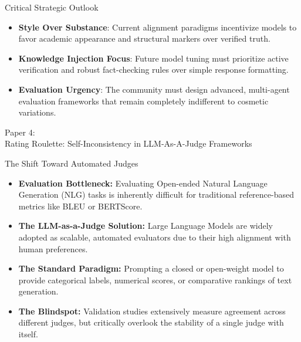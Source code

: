 \documentclass[10pt]{beamer}
\begin{document}
\begin{frame}{Critical Strategic Outlook}
  \begin{itemize}
    \item \textbf{Style Over Substance}: Current alignment paradigms incentivize models to favor academic appearance and structural markers over verified truth.
    \item \textbf{Knowledge Injection Focus}: Future model tuning must prioritize active verification and robust fact-checking rules over simple response formatting.
    \item \textbf{Evaluation Urgency}: The community must design advanced, multi-agent evaluation frameworks that remain completely indifferent to cosmetic variations.
  \end{itemize}
\end{frame}




\begin{frame}[standout]
  \hypertarget{paper4}{}
  \Large Paper 4:\\Rating Roulette: Self-Inconsistency in LLM-As-A-Judge Frameworks
\end{frame}

\begin{frame}{The Shift Toward Automated Judges}
  \begin{itemize}
    \item \textbf{Evaluation Bottleneck:} Evaluating Open-ended Natural Language Generation (NLG) tasks is inherently difficult for traditional reference-based metrics like BLEU or BERTScore.
    \item \textbf{The LLM-as-a-Judge Solution:} Large Language Models are widely adopted as scalable, automated evaluators due to their high alignment with human preferences.
    \item \textbf{The Standard Paradigm:} Prompting a closed or open-weight model to provide categorical labels, numerical scores, or comparative rankings of text generation.
    \item \textbf{The Blindspot:} Validation studies extensively measure agreement across different judges, but critically overlook the stability of a single judge with itself.
  \end{itemize}
\end{frame}
\end{document}
